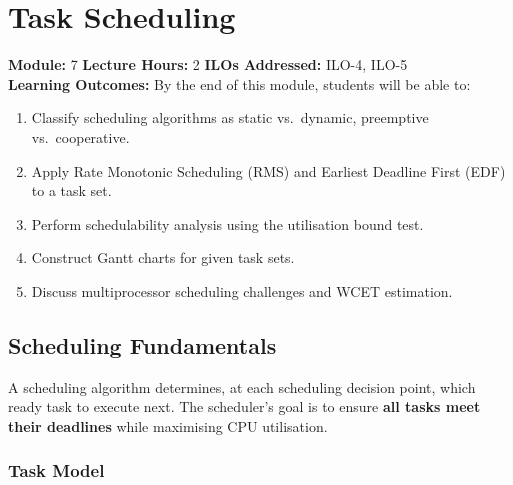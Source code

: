 
\chapter{Task Scheduling}
\label{ch:scheduling}

\begin{moduleinfo}
  \textbf{Module:} 7 \quad
  \textbf{Lecture Hours:} 2 \quad
  \textbf{ILOs Addressed:} ILO-4, ILO-5 \\[4pt]
  \textbf{Learning Outcomes:} By the end of this module, students will be able to:
  \begin{enumerate}[nosep]
    \item Classify scheduling algorithms as static vs.\ dynamic, preemptive vs.\ cooperative.
    \item Apply Rate Monotonic Scheduling (RMS) and Earliest Deadline First (EDF) to a task set.
    \item Perform schedulability analysis using the utilisation bound test.
    \item Construct Gantt charts for given task sets.
    \item Discuss multiprocessor scheduling challenges and WCET estimation.
  \end{enumerate}
\end{moduleinfo}

\section{Scheduling Fundamentals}
\label{sec:sched:basics}

\begin{definition}
A scheduling algorithm determines, at each scheduling decision point, which ready task to execute next. The scheduler's goal is to ensure \textbf{all tasks meet their deadlines} while maximising CPU utilisation.
\end{definition}

\subsection{Task Model}

